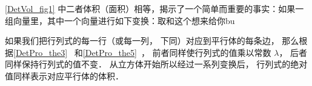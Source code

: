 \autoref{DetVol_fig1} 中二者体积（面积）相等，揭示了一个简单而重要的事实：如果一组向量里，其中一个向量进行如下变换：取和这个想来给你bu





如果我们把行列式的每一行（或每一列， 下同）对应到平行体的每条边， 那么根据\autoref{DetPro_the3}~ 和\autoref{DetPro_the5}~， 前者同样使行列式的值乘以常数 $\lambda$， 后者同样保持行列式的值不变． 从立方体开始所以经过一系列变换后， 行列式的绝对值同样表示对应平行体的体积．
